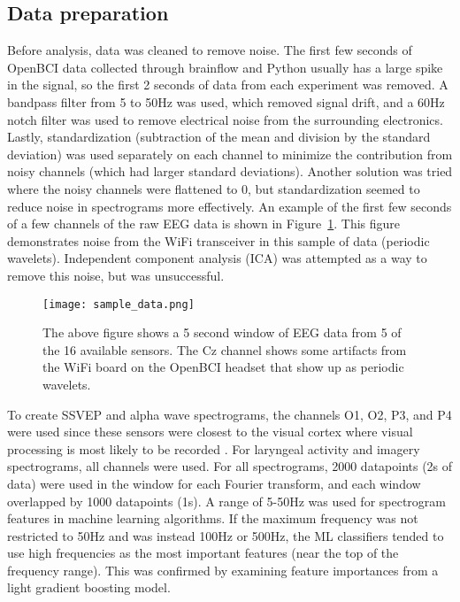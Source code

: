 \documentclass{article}
\begin{document}
\subsection{Data preparation}
Before analysis, data was cleaned to remove noise. The first few seconds of OpenBCI data collected through brainflow and Python usually has a large spike in the signal, so the first 2 seconds of data from each experiment was removed. A bandpass filter from 5 to 50Hz was used, which removed signal drift, and a 60Hz notch filter was used to remove electrical noise from the surrounding electronics. Lastly,  standardization (subtraction of the mean and division by the standard deviation) was used separately on each channel to minimize the contribution from noisy channels (which had larger standard deviations). Another solution was tried where the noisy channels were flattened to 0, but standardization seemed to reduce noise in spectrograms more effectively. An example of the first few seconds of a few channels of the raw EEG data is shown in Figure~\ref{data_sample}. This figure demonstrates noise from the WiFi transceiver in this sample of data (periodic wavelets). Independent component analysis (ICA) was attempted as a way to remove this noise, but was unsuccessful.

\begin{figure}
    \centering
    \texttt{[image: sample\_data.png]}
    \caption{The above figure shows a 5 second window of EEG data from 5 of the 16 available sensors. The Cz channel shows some artifacts from the WiFi board on the OpenBCI headset that show up as periodic wavelets.}
    \label{data_sample}
\end{figure}

To create SSVEP and alpha wave spectrograms, the channels O1, O2, P3, and P4 were used since these sensors were closest to the visual cortex where visual processing is most likely to be recorded \citep{MCFARLAND2017194}. For laryngeal activity and imagery spectrograms, all channels were used. For all spectrograms, 2000 datapoints (2s of data) were used in the window for each Fourier transform, and each window overlapped by 1000 datapoints (1s). A range of 5-50Hz was used for spectrogram features in machine learning algorithms. If the maximum frequency was not restricted to 50Hz and was instead 100Hz or 500Hz, the ML classifiers tended to use high frequencies as the most important features (near the top of the frequency range). This was confirmed by examining feature importances from a light gradient boosting model.
\end{document}
